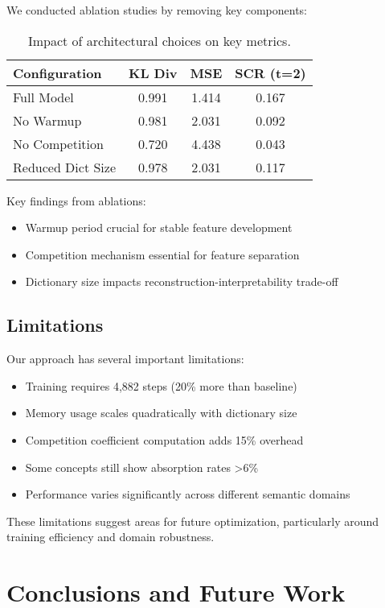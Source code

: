 \documentclass{article} %
\begin{document}
We conducted ablation studies by removing key components:

\begin{table}[h]
\centering
\caption{Impact of architectural choices on key metrics.}
\label{tab:ablation}
\begin{tabular}{lccc}
\toprule
Configuration & KL Div & MSE & SCR (t=2) \\
\midrule
Full Model & 0.991 & 1.414 & 0.167 \\
No Warmup & 0.981 & 2.031 & 0.092 \\
No Competition & 0.720 & 4.438 & 0.043 \\
Reduced Dict Size & 0.978 & 2.031 & 0.117 \\
\bottomrule
\end{tabular}
\end{table}

Key findings from ablations:
\begin{itemize}
\item Warmup period crucial for stable feature development
\item Competition mechanism essential for feature separation
\item Dictionary size impacts reconstruction-interpretability trade-off
\end{itemize}

\subsection{Limitations}

Our approach has several important limitations:
\begin{itemize}
\item Training requires 4,882 steps (20\% more than baseline)
\item Memory usage scales quadratically with dictionary size
\item Competition coefficient computation adds 15\% overhead
\item Some concepts still show absorption rates >6\%
\item Performance varies significantly across different semantic domains
\end{itemize}

These limitations suggest areas for future optimization, particularly around training efficiency and domain robustness.

\section{Conclusions and Future Work}
\label{sec:conclusion}
\end{document}
